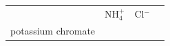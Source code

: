 \begin{enumerate}[noitemsep, label=\textbf{\arabic*}. ]
{{\begin{center}
\begin{xtabular}[t]{|l|l|l|l|}
    
         &
    
    
        \begin{math}\mathrm{NH}_{4}^{+}\end{math} &
    
    
        \begin{math}\mathrm{Cl}{}^{-}\end{math} &
    
    
     \tabularnewline{}
    
    
        potassium chromate &
    
    
         &
    
    
         &
    
    
     \tabularnewline{}
    

\end{xtabular}
\end{center}}}
\end{enumerate}
